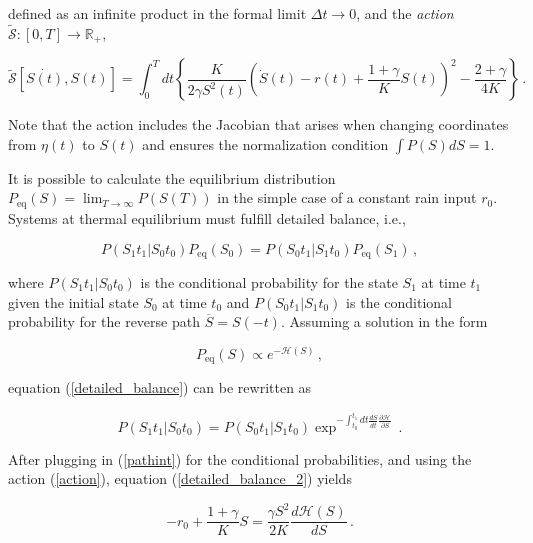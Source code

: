 \documentclass[11pt, a4paper]{article}
\begin{document}
defined as an infinite product in the formal limit $\Delta t \rightarrow 0$, and the {\em action} $\tilde{\mathcal S}:[0,T]\longrightarrow \mathbb R_+$,

\begin{equation}\label{action}
  \tilde{\mathcal S}[\dot{S(t)},S(t)]
  =
  \int_0^T
  dt
  \left\{
    \frac{K}{2\gamma S^2(t)}
    \left(
        \dot S(t)
        -
        r(t)
        +
        \frac{1+\gamma}{K}S(t)
    \right)^2
    -
    \frac{2+\gamma}{4K}
  \right\}
 \,.
\end{equation}

Note that the action includes the Jacobian that arises when changing coordinates from ${\eta(t)}$ to $S(t)$ and ensures the normalization condition $\int{ P(S) \mathit{dS}}=1$.

It is possible to calculate the equilibrium distribution $P_{\text{eq}}(S) = \lim_{T\rightarrow\infty} P(S(T))$ in the simple case of a constant rain input $r_{0}$. Systems at thermal equilibrium must fulfill detailed balance, i.e.,

\begin{equation}\label{detailed_balance}
P(S_1 t_1 | S_0 t_0 ) P_{\text{eq}}(S_0) = P(S_0 t_1 | S_1 t_0 ) P_{\text{eq}}(S_1) \,,
\end{equation}

where $P(S_1 t_1 | S_0 t_0 )$ is the conditional probability for the state $S_1$ at time $t_1$ given the initial state $S_0$ at time $t_0$ and $P(S_0 t_1 | S_1 t_0 )$ is the conditional probability for the reverse path $\overline{S} = S(-t)$. Assuming a solution in the form

\begin{equation}\label{Peq}
  P_{\text{eq}}(S)
  \propto
  e^{-\mathcal{H}(S)}\,,
\end{equation}

equation (\ref{detailed_balance}) can be rewritten as

\begin{equation}\label{detailed_balance_2}
P(S_1 t_1 | S_0 t_0 ) = P(S_0 t_1 | S_1 t_0 ) \exp^{-\int_{t_0}^{t_1} dt \frac{dS}{dt}\frac{\partial \mathcal{H}}{\partial S}}\,.
\end{equation}

After plugging in (\ref{pathint}) for the conditional probabilities, and using the action (\ref{action}), equation (\ref{detailed_balance_2}) yields

\begin{equation}\label{constant_rain_H}
-r_{0}+\frac{1+\gamma}{K}S
=
\frac{\gamma S^2}{2K}
\frac{d \mathcal{H}(S)}{dS}\,.
\end{equation}
\end{document}
